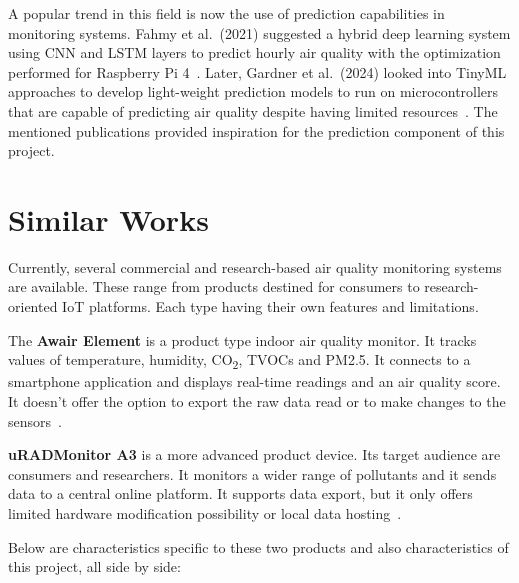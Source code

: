 A popular trend in this field is now the use of prediction capabilities in monitoring systems.
Fahmy et al.\ (2021) suggested a hybrid deep learning system using CNN and LSTM layers to
predict hourly air quality with the optimization performed for Raspberry Pi
4~\cite{fahmy2021}. Later, Gardner et al.\ (2024) looked into TinyML approaches to develop
light-weight prediction models to run on microcontrollers that are capable of predicting air
quality despite having limited resources~\cite{gardner2024}. The mentioned publications provided
inspiration for the prediction component of this project.

\section{Similar Works}
\label{sec:similar-works}

Currently, several commercial and research-based air quality monitoring systems are available.
These range from products destined for consumers to research-oriented IoT platforms. Each type
having their own features and limitations.

The \textbf{Awair Element} is a product type indoor air quality monitor. It tracks values of
temperature, humidity, CO\textsubscript{2}, TVOCs and PM2.5. It connects to a smartphone
application and displays real-time readings and an air quality score. It doesn't offer the
option to export the raw data read or to make changes to the sensors~\cite{awair}.

\textbf{uRADMonitor A3} is a more advanced product device. Its target audience are consumers
and researchers. It monitors a wider range of pollutants and it sends data to a central online
platform. It supports data export, but it only offers limited hardware modification possibility
or local data hosting~\cite{uradmonitor}.

Below are characteristics specific to these two products and also characteristics of this
project, all side by side:

\vspace{12pt}

